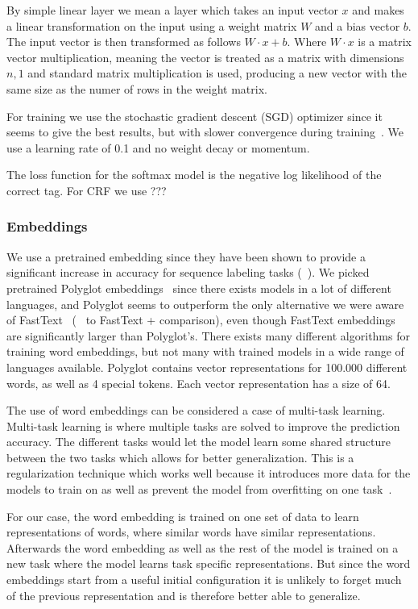 By simple linear layer we mean a layer which takes an input vector $x$ and makes
a linear transformation on the input using a weight matrix $W$ and a bias vector
$b$. The input vector is then transformed as follows $W \cdot x + b$. Where $W
\cdot x$ is a matrix vector multiplication, meaning the vector is treated as a
matrix with dimensions $n,1$ and standard matrix multiplication is used,
producing a new vector with the same size as the numer of rows in the weight
matrix.

For training we use the stochastic gradient descent (SGD) optimizer since it
seems to give the best results, but with slower convergence during
training~\cite{Yang_liang_zhang}. We use a learning rate of 0.1 and no weight
decay or momentum.

The loss function for the softmax model is the negative log likelihood of the
correct tag. For CRF we use ???

\subsubsection{Embeddings}

We use a pretrained embedding since they have been shown to provide a
significant increase in accuracy for sequence labeling tasks (~\cite{Yang liang
zhang}). We picked pretrained Polyglot embeddings~\cite{Polyglot} since there
exists models in a lot of different languages, and Polyglot seems to outperform
the only alternative we were aware of FastText~\cite{FastText} (~\cite{} to
FastText + comparison), even though FastText embeddings are significantly larger
than Polyglot's. There exists many different algorithms for training word
embeddings, but not many with trained models in a wide range of languages
available. Polyglot contains vector representations for 100.000 different words,
as well as 4 special tokens. Each vector representation has a size of 64.

The use of word embeddings can be considered a case of multi-task learning.
Multi-task learning is where multiple tasks are solved to improve the prediction
accuracy. The different tasks would let the model learn some shared structure
between the two tasks which allows for better generalization. This is a
regularization technique which works well because it introduces more data for
the models to train on as well as prevent the model from overfitting on one
task~\cite{goodfellow2016deep}. 

For our case, the word embedding is trained on one set of data to learn
representations of words, where similar words have similar representations.
Afterwards the word embedding as well as the rest of the model is trained on a
new task where the model learns task specific representations. But since the
word embeddings start from a useful initial configuration it is unlikely to
forget much of the previous representation and is therefore better able to
generalize.

